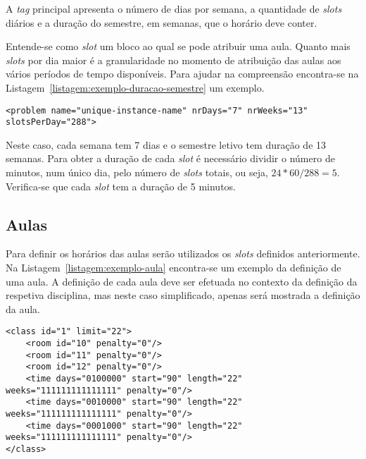 A \textit{tag} principal apresenta o número de dias por semana, a quantidade de \textit{slots} diários e a duração do semestre, em semanas, que o horário deve conter.

Entende-se como \textit{slot} um bloco ao qual se pode atribuir uma aula. Quanto mais \textit{slots} por dia maior é a granularidade no momento de atribuição das aulas aos vários períodos de tempo disponíveis. Para ajudar na compreensão encontra-se na Listagem~\ref{listagem:exemplo-duracao-semestre} um exemplo.

\begin{minipage}[c]{\linewidth}
\begin{lstlisting}[caption={Exemplo da definição da duração do semestre.}, label={listagem:exemplo-duracao-semestre}]
<problem name="unique-instance-name" nrDays="7" nrWeeks="13" slotsPerDay="288">
\end{lstlisting}
\end{minipage}

Neste caso, cada semana tem 7 dias e o semestre letivo tem duração de 13 semanas. Para obter a duração de cada \textit{slot} é necessário dividir o número de minutos, num único dia, pelo número de \textit{slots} totais, ou seja, $24*60/288 = 5$. Verifica-se que cada \textit{slot} tem a duração de 5 minutos.

\subsection{Aulas}

Para definir os horários das aulas serão utilizados os \textit{slots} definidos anteriormente. Na Listagem~\ref{listagem:exemplo-aula} encontra-se um exemplo da definição de uma aula. A definição de cada aula deve ser efetuada no contexto da definição da respetiva disciplina, mas neste caso simplificado, apenas será mostrada a definição da aula.

\begin{minipage}[c]{\linewidth}
\begin{lstlisting}[caption={Exemplo da definição de uma aula.}, label={listagem:exemplo-aula}]
<class id="1" limit="22">
    <room id="10" penalty="0"/>
    <room id="11" penalty="0"/>
    <room id="12" penalty="0"/>
    <time days="0100000" start="90" length="22" weeks="111111111111111" penalty="0"/>
    <time days="0010000" start="90" length="22" weeks="111111111111111" penalty="0"/>
    <time days="0001000" start="90" length="22" weeks="111111111111111" penalty="0"/>
</class>
\end{lstlisting}
\end{minipage}

